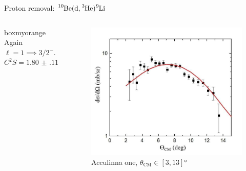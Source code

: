 \documentclass[sans,
frameno, %
mp,
usenames,dvipsnames, %
onlytextwidth, %
t,%
11pt]{beamer}
\newcommand{\iso}[2]{\ce{^{#1}#2}}
\begin{document}
\begin{frame}{Proton removal: $\iso{10}{Be}(\textrm{d}, \iso{3}{He})\iso{9}{Li}$}
{\begin{columns}[t]
{                \medskip
                \hfill
                \begin{beamercolorbox}[sep=1ex,center, rounded=true, wd=0.95\linewidth]{boxmyorange}
                    Again $\ell = 1 \implies 3/2^{-}$. \\
                    $C^2S = \qty{1.80(11)}{}$
                \end{beamercolorbox}
                \hfill
            }
            \hfill
            {
                {
                    \begin{figure}
                        \centering
                        \captionsetup{belowskip=3.5pt}
                        \caption{Acculinna one, $\theta_{\textrm{CM}} \in \left[3, 13\right]\unit{\degree}$}
                        \includegraphics[width=0.8\linewidth, cfbox=Mulberry 1pt 0pt 0pt]{figures/acculina_xs.png}%
                    \end{figure}

}}
\end{columns}}
\end{frame}
\end{document}
